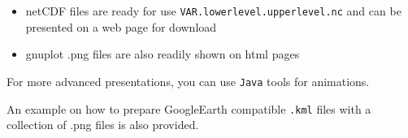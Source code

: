 \documentclass[8pt,a4paper,notitlepage]{book}
\begin{document}
\begin{itemize}
\item netCDF files are ready for use {\tt VAR.lowerlevel.upperlevel.nc} and can be presented on a web page for download
\item gnuplot .png files are also readily shown on html pages 
\end{itemize}

For more advanced presentations, you can use {\tt Java} tools for animations.

An example on how to prepare GoogleEarth compatible {\tt .kml} files with a collection of .png files is also provided.
\end{document}
